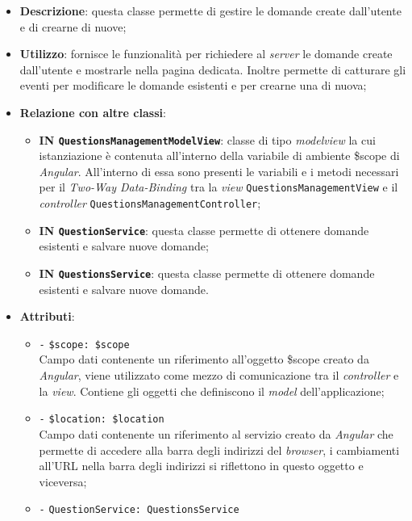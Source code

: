 \begin{itemize}
	\item \textbf{Descrizione}: questa classe permette di gestire le domande create dall'utente e di crearne di nuove;
	\item \textbf{Utilizzo}: fornisce le funzionalità per richiedere al \textit{server} le domande create dall'utente e mostrarle nella pagina dedicata. Inoltre permette di catturare gli eventi per modificare le domande esistenti e per crearne una di nuova; 
	\item \textbf{Relazione con altre classi}:
	\begin{itemize}
		\item \textbf{IN \texttt{QuestionsManagementModelView}}: classe di tipo \textit{modelview} la cui istanziazione è contenuta all'interno della variabile di ambiente \$scope di \textit{Angular}. All'interno di essa sono presenti le variabili e i metodi necessari per il \textit{Two-Way Data-Binding} tra la \textit{view} \texttt{QuestionsManagementView} e il \textit{controller} \texttt{QuestionsManagementController}; 
		\item \textbf{IN \texttt{QuestionService}}: questa classe permette di ottenere domande esistenti e salvare nuove domande;
		\item \textbf{IN \texttt{QuestionsService}}: questa classe permette di ottenere domande esistenti e salvare nuove domande.
	\end{itemize}
	\item \textbf{Attributi}:
	\begin{itemize}
		\item \texttt{-} \texttt{\$scope: \$scope} \\
		Campo dati contenente un riferimento all'oggetto \$scope creato da \textit{Angular}, viene utilizzato come mezzo di comunicazione tra il \textit{controller} e la \textit{view}. Contiene gli oggetti che definiscono il \textit{model} dell'applicazione;
		\item \texttt{-} \texttt{\$location: \$location} \\
		Campo dati contenente un riferimento al servizio creato da \textit{Angular} che permette di accedere alla barra degli indirizzi del \textit{browser}, i cambiamenti all'URL nella barra degli indirizzi si riflettono in questo oggetto e viceversa;
		\item \texttt{-} \texttt{QuestionService: QuestionsService}\\

\end{itemize}
\end{itemize}
